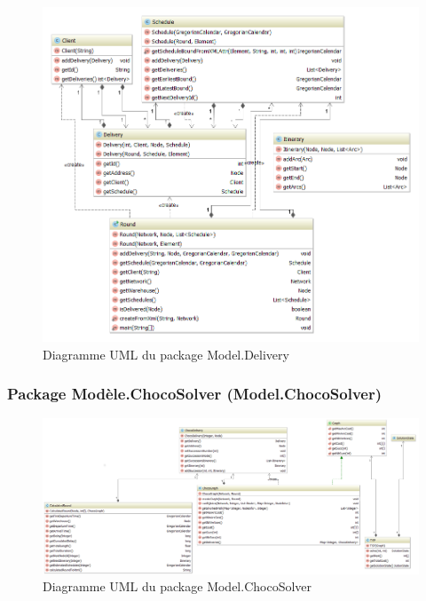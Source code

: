 \begin{figure}[h]
    \centering
    \includegraphics[width=160mm]{../diagrams/classes_packages/classes_packages/model/delivery.png}
    \caption{Diagramme UML du package Model.Delivery}
    \label{diagram:uml_model_delivery}
\end{figure}
\pagebreak

\begin{landscape}
\subsubsection{Package Mod\`ele.ChocoSolver (Model.ChocoSolver)}

\begin{figure}[h]
    \centering
    \includegraphics[width=240mm]{../diagrams/classes_packages/classes_packages/model/chocoSolver.png}
    \caption{Diagramme UML du package Model.ChocoSolver}
    \label{diagram:uml_model_choco}
\end{figure}
\end{landscape}
\pagebreak

